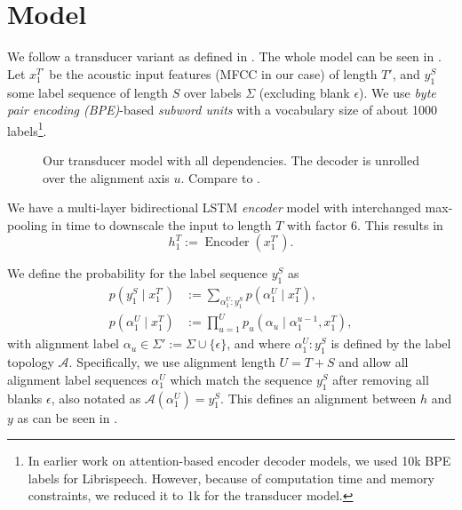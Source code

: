 \documentclass[a4paper]{article}
\newcommand{\blank}{\ensuremath{\epsilon}}
\begin{document}
\section{Model}

We follow a transducer variant as defined in \cite{zeyer2020:transducer}.
The whole model can be seen in .
Let $x_1^{T'}$ be the acoustic input features (MFCC in our case) of length $T'$,
and $y_1^S$ some label sequence of length $S$ over labels $\Sigma$
(excluding blank \blank).
We use \emph{byte pair encoding (BPE)}-based \emph{subword units}
\cite{sennrich2015neuralbpe,zeyer2018:asr-attention}
with a vocabulary size of about 1000 labels\footnote{In earlier work on attention-based encoder decoder models,
we used 10k BPE labels for Librispeech.
However, because of computation time and memory constraints,
we reduced it to 1k for the transducer model.}.

\begin{figure}
\caption[Transducer model]{Our transducer model with all dependencies.
The decoder is unrolled over the alignment axis $u$.
Compare to \cite{zeyer2020:transducer}.}
\label{fig:librispeech_transducer}
\end{figure}

We have a multi-layer bidirectional LSTM \cite{hochreiter1997lstm} \emph{encoder} model
with interchanged max-pooling in time to downscale the input to length $T$
with factor 6.
This results in
\[ h_1^T := \operatorname{Encoder}(x_1^{T'}) . \]

We define the probability for the label sequence $y_1^S$ as
\begin{align*}
p(y_1^S \mid x_1^{T'} ) & :=
\sum_{\alpha_1^U : y_1^S} p(\alpha_1^U \mid x_1^T), \\
p(\alpha_1^U \mid x_1^T)
& := \prod_{u=1}^U p_u(\alpha_u \mid \alpha_1^{u-1}, x_1^T),
\end{align*}
with alignment label $\alpha_u \in \Sigma' := \Sigma \cup \{\blank\}$,
and where $\alpha_1^U : y_1^S$ is defined by the label topology $\mathcal{A}$.
Specifically, we use alignment length $U = T + S$
and allow all alignment label sequences $\alpha_1^U$
which match the sequence $y_1^S$ after removing all blanks \blank,
also notated as $\mathcal{A}(\alpha_1^U) = y_1^S$.
This defines an alignment between $h$ and $y$
as can be seen in .
\end{document}
